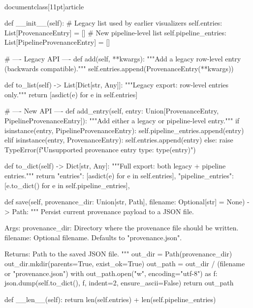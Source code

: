 \\documentclass[11pt]{article}
\begin{document}
\begin{CodeBlock}
    def __init__(self):
        # Legacy list used by earlier visualizers
        self.entries: List[ProvenanceEntry] = []
        # New pipeline-level list
        self.pipeline_entries: List[PipelineProvenanceEntry] = []

    # ---- Legacy API ----
    def add(self, **kwargs):
        """Add a legacy row-level entry (backwards compatible)."""
        self.entries.append(ProvenanceEntry(**kwargs))

    def to_list(self) -> List[Dict[str, Any]]:
        """Legacy export: row-level entries only."""
        return [asdict(e) for e in self.entries]

    # ---- New API ----
    def add_entry(self, entry: Union[ProvenanceEntry, PipelineProvenanceEntry]):
        """Add either a legacy or pipeline-level entry."""
        if isinstance(entry, PipelineProvenanceEntry):
            self.pipeline_entries.append(entry)
        elif isinstance(entry, ProvenanceEntry):
            self.entries.append(entry)
        else:
            raise TypeError(f"Unsupported provenance entry type: {type(entry)}")

    def to_dict(self) -> Dict[str, Any]:
        """Full export: both legacy + pipeline entries."""
        return {
            "entries": [asdict(e) for e in self.entries],
            "pipeline_entries": [e.to_dict() for e in self.pipeline_entries],
        }

    def save(self, provenance_dir: Union[str, Path], filename: Optional[str] = None) -> Path:
        """
        Persist current provenance payload to a JSON file.

        Args:
            provenance_dir: Directory where the provenance file should be written.
            filename: Optional filename. Defaults to "provenance.json".

        Returns:
            Path to the saved JSON file.
        """
        out_dir = Path(provenance_dir)
        out_dir.mkdir(parents=True, exist_ok=True)
        out_path = out_dir / (filename or "provenance.json")
        with out_path.open("w", encoding="utf-8") as f:
            json.dump(self.to_dict(), f, indent=2, ensure_ascii=False)
        return out_path

    def __len__(self):
        return len(self.entries) + len(self.pipeline_entries)

\end{CodeBlock}
\end{document}
